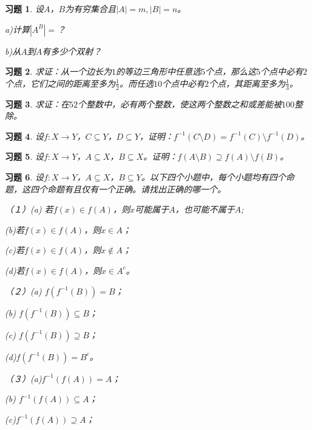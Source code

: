 \documentclass{article}
\begin{document}
\begin{CJK}{UTF8}{gbsn}
\newtheorem{Exercise}{习题}
\begin{Exercise}
  设$A$，$B$为有穷集合且$|A|=m, |B|=n$。

  a)计算$|A^B|=$？


  b)从$A$到$A$有多少个双射？
\end{Exercise}
\vspace{10cm}
\begin{Exercise}
求证：从一个边长为$1$的等边三角形中任意选$5$个点，那么这$5$个点中必有$2$个点，它们之间的距离至多为$\frac{1}{2}$。而任选$10$个点中必有$2$个点，其距离至多为$\frac{1}{3}$。
\end{Exercise}
\vspace{10cm}
\begin{Exercise}
  求证：在$52$个整数中，必有两个整数，使这两个整数之和或差能被$100$整除。
\end{Exercise}
\vspace{10cm}
\begin{Exercise}
  设$f:X\to Y$，$C\subseteq Y$，$D\subseteq Y$，证明：$f^{-1}(C\setminus D)=f^{-1}(C)\setminus f^{-1}(D)$。
\end{Exercise}
\vspace{10cm}
\begin{Exercise}
  设$f:X\to Y$，$A\subseteq X$，$B\subseteq X$。证明：$f(A\setminus B) \supseteq  f(A)\setminus f(B)$。
\end{Exercise}
\vspace{10cm}
\begin{Exercise}
  设$f:X\to Y$，$A\subseteq X$，$B\subseteq Y$。以下四个小题中，每个小题均有四个命题，这四个命题有且仅有一个正确。请找出正确的哪一个。

  （１）(a) 若$f(x)\in f(A)$，则$x$可能属于$A$，也可能不属于$A$;

  (b)若$f(x)\in f(A)$，则$x\in A$；

  (c)若$f(x)\in f(A)$，则$x\notin A$；

  (d)若$f(x)\in f(A)$，则$x\in A^c$。

  （２）(a) $f(f^{-1}(B))=B$；

  (b) $f(f^{-1}(B))\subseteq B$；

  (c) $f(f^{-1}(B))\supseteq B$；

  (d)$f(f^{-1}(B))= B^c$。

  （３）(a)$f^{-1}(f(A))=A$；

  (b) $f^{-1}(f(A))\subseteq A$；

  (c)$f^{-1}(f(A))\supseteq A$；


\end{Exercise}
\end{CJK}
\end{document}
